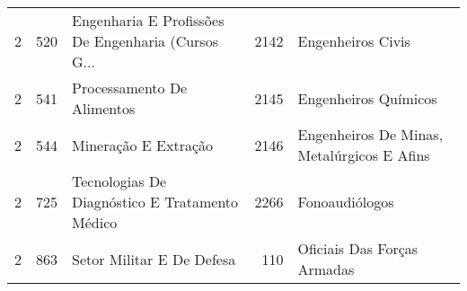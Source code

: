 \begin{table}
\begin{tabular}{rrlrl}
       2 &    520 & Engenharia E Profissões De Engenharia (Cursos G... & 2142 &                         Engenheiros Civis  \\
       2 &    541 &                         Processamento De Alimentos & 2145 &                       Engenheiros Químicos \\
       2 &    544 &                               Mineração E Extração & 2146 & Engenheiros De Minas, Metalúrgicos E Afins \\
       2 &    725 &     Tecnologias De Diagnóstico E Tratamento Médico & 2266 &                             Fonoaudiólogos \\
       2 &    863 &                          Setor Militar E De Defesa &  110 &                Oficiais Das Forças Armadas \\
\bottomrule
\end{tabular}
\end{table}
